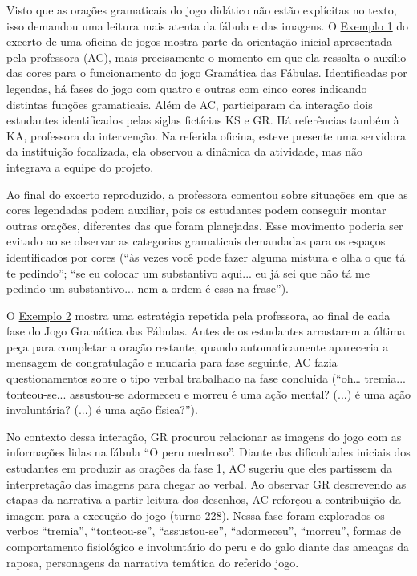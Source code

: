 Visto que as orações gramaticais do jogo didático não estão explícitas
no texto, isso demandou uma leitura mais atenta da fábula e das imagens.
O \hyperref[tab-02]{Exemplo 1} do excerto de uma oficina de jogos mostra parte da
orientação inicial apresentada pela professora (AC), mais precisamente o
momento em que ela ressalta o auxílio das cores para o funcionamento do
jogo Gramática das Fábulas. Identificadas por legendas, há fases do jogo
com quatro e outras com cinco cores indicando distintas funções
gramaticais. Além de AC, participaram da interação dois estudantes
identificados pelas siglas fictícias KS e GR. Há referências também à
KA, professora da intervenção. Na referida oficina, esteve presente uma
servidora da instituição focalizada, ela observou a dinâmica da
atividade, mas não integrava a equipe do projeto.




	Ao final do excerto reproduzido, a professora comentou sobre situações
	em que as cores legendadas podem auxiliar, pois os estudantes podem
	conseguir montar outras orações, diferentes das que foram planejadas.
	Esse movimento poderia ser evitado ao se observar as categorias
	gramaticais demandadas para os espaços identificados por cores (``às
	vezes você pode fazer alguma mistura e olha o que tá te pedindo''; ``se
	eu colocar um substantivo aqui... eu já sei que não tá me pedindo um
	substantivo... nem a ordem é essa na frase'').
	
	O \hyperref[tab-03]{Exemplo 2} mostra uma estratégia repetida pela professora, ao final de
	cada fase do Jogo Gramática das Fábulas. Antes de os estudantes
	arrastarem a última peça para completar a oração restante, quando
	automaticamente apareceria a mensagem de congratulação e mudaria para
	fase seguinte, AC fazia questionamentos sobre o tipo verbal trabalhado
	na fase concluída (``oh\ldots{} tremia... tonteou-se... assustou-se
	adormeceu e morreu é uma ação mental? (...) é uma ação involuntária?
	(...) é uma ação física?'').
	


	
	
	No contexto dessa interação, GR procurou relacionar as imagens do jogo
	com as informações lidas na fábula ``O peru medroso''. Diante das
	dificuldades iniciais dos estudantes em produzir as orações da fase 1,
	AC sugeriu que eles partissem da interpretação das imagens para chegar
	ao verbal. Ao observar GR descrevendo as etapas da narrativa a partir
	leitura dos desenhos, AC reforçou a contribuição da imagem para a
	execução do jogo (turno 228). Nessa fase foram explorados os verbos
	``tremia'', ``tonteou-se'', ``assustou-se'', ``adormeceu'', ``morreu'',
	formas de comportamento fisiológico e involuntário do peru e do galo
	diante das ameaças da raposa, personagens da narrativa temática do
	referido jogo.
	
